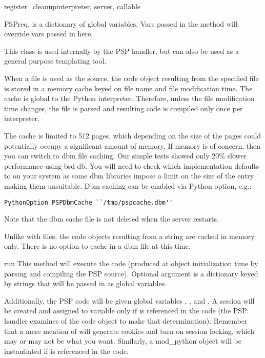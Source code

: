 \begin{funcdesc}{register_cleanup}{interpreter, server, callable}
\begin{classdesc}{PSP}{req, }
   is a dictionary of global variables. Vars passed in the
   method will override vars passed in here.

  This class is used internally by the PSP handler, but can also be
  used as a general purpose templating tool.

  When a file is used as the source, the code object resulting from
  the specified file is stored in a memory cache keyed on file name
  and file modification time. The cache is global to the Python
  interpreter. Therefore, unless the file modification time changes,
  the file is parsed and resulting code is compiled only once per
  interpreter.

  The cache is limited to 512 pages, which depending on the size of
  the pages could potentially occupy a significant amount of
  memory. If memory is of concern, then you can switch to dbm file
  caching. Our simple tests showed only 20\% slower performance using
  bsd db. You will need to check which implementation 
  defaults to on your system as some dbm libraries impose a limit on
  the size of the entry making them unsuitable. Dbm caching can be
  enabled via  Python option, e.g.:

\begin{verbatim}
PythonOption PSPDbmCache ``/tmp/pspcache.dbm''
\end{verbatim}
  Note that the dbm cache file is not deleted when the server
  restarts.

  Unlike with files, the code objects resulting from a string are
  cached in memory only. There is no option to cache in a dbm file at
  this time.

  \begin{methoddesc}[PSP]{run}{}
    This method will execute the code (produced at object
    initialization time by parsing and compiling the PSP
    source). Optional argument  is a dictionary keyed by
    strings that will be passed in as global variables.

    Additionally, the PSP code will be given global variables
    , ,  and . A session
    will be created and assigned to  variable only if
     is referenced in the code (the PSP handler examines
     of the code object to make that
    determination). Remember that a mere mention of 
    will generate cookies and turn on session locking, which may or
    may not be what you want. Similarly, a mod_python
     object will be instantiated if  is
    referenced in the code.


\end{methoddesc}
\end{classdesc}
\end{funcdesc}
